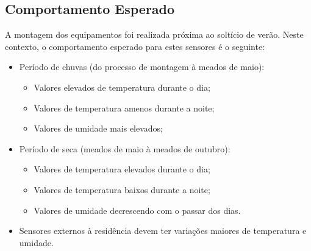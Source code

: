 \subsection{Comportamento Esperado}
\quad A montagem dos equipamentos foi realizada próxima ao soltício de verão. Neste contexto, o comportamento esperado para estes sensores é o seguinte:
\begin{itemize}
  \item Período de chuvas (do processo de montagem à meados de maio):
  \begin{itemize}
    \item Valores elevados de temperatura durante o dia;
    \item Valores de temperatura amenos durante a noite;
    \item Valores de umidade mais elevados;

  \end{itemize}
  \item Período de seca (meados de maio à meados de outubro):
  \begin{itemize}
    \item Valores de temperatura elevados durante o dia;
    \item Valores de temperatura baixos durante a noite;
    \item Valores de umidade decrescendo com o passar dos dias.
  \end{itemize}
  \item Sensores externos à residência devem ter variações maiores de temperatura e umidade.
\end{itemize}


